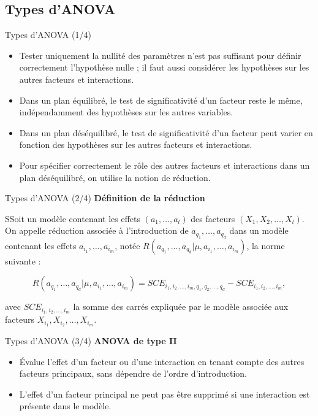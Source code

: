 \documentclass{beamer}
\begin{document}
	\subsection{Types d'ANOVA}
	\begin{frame}{Types d'ANOVA (1/4)}
		\begin{itemize}
			\item Tester uniquement la nullité des paramètres n'est pas suffisant pour définir correctement l'hypothèse nulle ; il faut aussi considérer les hypothèses sur les autres facteurs et interactions.
			\vfill
			\pause
			\item Dans un plan équilibré, le test de significativité d'un facteur reste le même, indépendamment des hypothèses sur les autres variables.
			\vfill
			\pause
			\item Dans un plan déséquilibré, le test de significativité d'un facteur peut varier en fonction des hypothèses sur les autres facteurs et interactions.
			\vfill
			\pause
			\item Pour spécifier correctement le rôle des autres facteurs et interactions dans un plan déséquilibré, on utilise la notion de réduction.
		\end{itemize}
	\end{frame}
	
	
	\begin{frame}{Types d'ANOVA (2/4)}
		\textbf{Définition de la réduction}
		\begin{myblock}
			SSoit un modèle contenant les effets $(a_1, \ldots, a_l)$ des facteurs $(X_1, X_2, \ldots, X_l)$. On appelle réduction associée à l'introduction de $a_{q_1}, \ldots, a_{q_d}$ dans un modèle contenant les effets $a_{i_1}, \ldots, a_{i_m}$, notée $R(a_{q_1}, \ldots, a_{q_d}|\mu, a_{i_1}, \ldots, a_{i_m})$, la norme suivante :
			
			\begin{equation}
				R(a_{q_1}, \ldots, a_{q_d}|\mu, a_{i_1}, \ldots, a_{i_m}) = SCE_{i_1, i_2, \ldots, i_m, q_1, q_2, \ldots, q_d} - SCE_{i_1, i_2, \ldots, i_m},
			\end{equation}
			
			avec $SCE_{i_1, i_2, \ldots, i_m}$ la somme des carrés expliquée par le modèle associée aux facteurs $X_{i_1}, X_{i_2}, \ldots, X_{i_m}$.
		\end{myblock}
	\end{frame}
	
	
	\begin{frame}{Types d'ANOVA (3/4)}
		\textbf{ANOVA de type II}
		\begin{itemize}
			\item Évalue l'effet d'un facteur ou d'une interaction en tenant compte des autres facteurs principaux, sans dépendre de l'ordre d'introduction.
			\vfill
			\pause
			\item L'effet d'un facteur principal ne peut pas être supprimé si une interaction est présente dans le modèle.
		\end{itemize}
	\end{frame}
	
\end{document}
